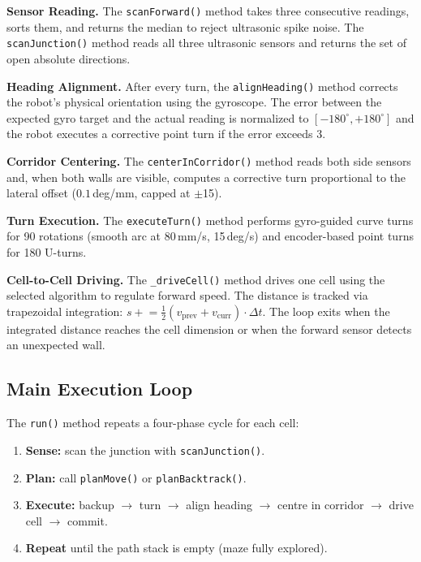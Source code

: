 \textbf{Sensor Reading.} The \texttt{scanForward()} method takes three consecutive readings, sorts them, and returns the median to reject ultrasonic spike noise. The \texttt{scanJunction()} method reads all three ultrasonic sensors and returns the set of open absolute directions.

\textbf{Heading Alignment.} After every turn, the \texttt{alignHeading()} method corrects the robot's physical orientation using the gyroscope. The error between the expected gyro target and the actual reading is normalized to $[-180^\circ, +180^\circ]$ and the robot executes a corrective point turn if the error exceeds 3\textdegree{}.

\textbf{Corridor Centering.} The \texttt{centerInCorridor()} method reads both side sensors and, when both walls are visible, computes a corrective turn proportional to the lateral offset ($0.1$\,deg/mm, capped at $\pm$15\textdegree{}).

\textbf{Turn Execution.} The \texttt{executeTurn()} method performs gyro-guided curve turns for 90\textdegree{} rotations (smooth arc at 80\,mm/s, 15\,deg/s) and encoder-based point turns for 180\textdegree{} U-turns.

\textbf{Cell-to-Cell Driving.} The \texttt{\_driveCell()} method drives one cell using the selected algorithm to regulate forward speed. The distance is tracked via trapezoidal integration: $s \mathrel{+}= \frac{1}{2}(v_{\text{prev}} + v_{\text{curr}}) \cdot \Delta t$. The loop exits when the integrated distance reaches the cell dimension or when the forward sensor detects an unexpected wall.


\subsection{Main Execution Loop}

The \texttt{run()} method repeats a four-phase cycle for each cell:

\begin{enumerate}
    \item \textbf{Sense:} scan the junction with \texttt{scanJunction()}.
    \item \textbf{Plan:} call \texttt{planMove()} or \texttt{planBacktrack()}.
    \item \textbf{Execute:} backup $\rightarrow$ turn $\rightarrow$ align heading $\rightarrow$ centre in corridor $\rightarrow$ drive cell $\rightarrow$ commit.
    \item \textbf{Repeat} until the path stack is empty (maze fully explored).
\end{enumerate}


